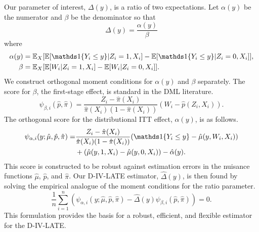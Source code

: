 \documentclass[final,3p,fleqn, 10pt]{elsarticle}
\begin{document}
Our parameter of interest, $\Delta(y)$, is a ratio of two expectations. Let $\alpha(y)$ be the numerator and $\beta$ be the denominator so that
$$ \Delta(y) = \frac{\alpha(y)}{\beta} $$
where
\begin{align*}
    \alpha(y) &= \mathbb{E}_{X}[\mathbb{E}[\ind\{Y_i \le y\} | Z_i=1, X_i] - \mathbb{E}[\ind\{Y_i \le y\} | Z_i=0, X_i]], \\
    \beta &= \mathbb{E}_{X}[\mathbb{E}[W_i | Z_i=1, X_i] - \mathbb{E}[W_i | Z_i=0, X_i]].
\end{align*}
We construct orthogonal moment conditions for $\alpha(y)$ and $\beta$ separately. The score for $\beta$, the first-stage effect, is standard in the DML literature.
\begin{equation} \label{eq:psi_beta}
\psi_{\beta, i}(\hat{p}, \hat{\pi}) = \frac{Z_i - \hat{\pi}(X_i)}{\hat{\pi}(X_i)(1-\hat{\pi}(X_i))} (W_i - \hat{p}(Z_i, X_i)).
\end{equation}
The orthogonal score for the distributional ITT effect, $\alpha(y)$, is as follows.
\begin{align} \label{eq:psi_alpha}
\psi_{\alpha, i}(y; \hat{\mu}, \hat{p}, \hat{\pi}) = & \frac{Z_i - \hat{\pi}(X_i)}{\hat{\pi}(X_i)(1-\hat{\pi}(X_i))} (\ind\{Y_i \le y\} - \hat{\mu}(y, W_i, X_i)) \nonumber \\
& + (\hat{\mu}(y, 1, X_i) - \hat{\mu}(y, 0, X_i)) - \hat{\alpha}(y).
\end{align}
This score is constructed to be robust against estimation errors in the nuisance functions $\hat{\mu}$, $\hat{p}$, and $\hat{\pi}$. Our D-IV-LATE estimator, $\hat{\Delta}(y)$, is then found by solving the empirical analogue of the moment conditions for the ratio parameter.
\begin{equation} \label{eq:moment_condition_ratio}
    \frac{1}{n} \sum_{i=1}^n \left( \psi_{\alpha, i}(y; \hat{\mu}, \hat{p}, \hat{\pi}) - \hat{\Delta}(y) \psi_{\beta, i}(\hat{p}, \hat{\pi}) \right) = 0.
\end{equation}
This formulation provides the basis for a robust, efficient, and flexible estimator for the D-IV-LATE.
\end{document}
